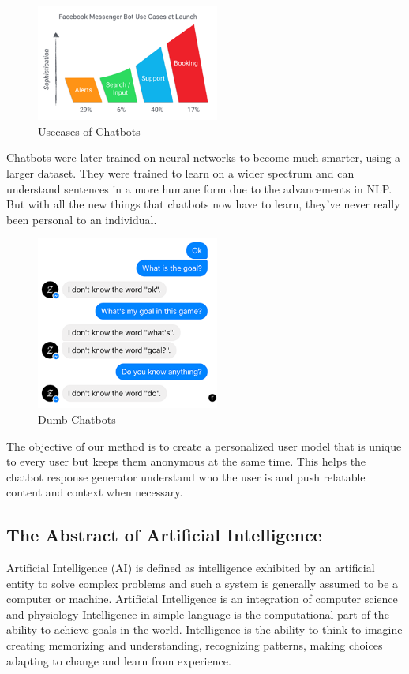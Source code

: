\documentclass[conference,compsoc]{IEEEtran}
\begin{document}
\begin{figure}[H]
    \centering
    \includegraphics[width=6cm]{images/chatbot-usecases.png}
    \caption{Usecases of Chatbots}
    \label{fig:chatbot-usecases}
\end{figure}

Chatbots were later trained on neural networks to become much smarter, using a larger dataset. They were trained to learn on a wider spectrum and can understand sentences in a more humane form due to the advancements in NLP. But with all the new things that chatbots now have to learn, they’ve never really been personal to an individual.

\begin{figure}[H]
    \centering
    \includegraphics[width=6cm]{images/dumb-chatbot.png}
    \caption{Dumb Chatbots}
    \label{fig:dumb-chatbot}
\end{figure}

The objective of our method is to create a personalized user model that is unique to every user but keeps them anonymous at the same time. This helps the chatbot response generator understand who the user is and push relatable content and context when necessary.

\subsection{The Abstract of Artificial Intelligence}

Artificial Intelligence (AI) is defined as intelligence exhibited by an artificial entity to solve complex problems and such a system is generally assumed to be a computer or machine. Artificial Intelligence is an integration of computer science and physiology Intelligence in simple language is the computational part of the ability to achieve goals in the world. Intelligence is the ability to think to imagine creating memorizing and understanding, recognizing patterns, making choices adapting to change and learn from experience.
\end{document}
